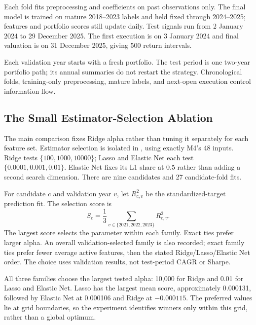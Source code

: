 \documentclass[11pt,a4paper]{article}
\newcommand{\code}[1]{\texttt{\detokenize{#1}}}
\newcommand{\tbl}[3]{\begin{table}[htbp]\centering\small
\caption{#2}\label{#3}#1\end{table}}
\begin{document}
Each fold fits preprocessing and coefficients on past observations only.
The final model is trained on mature 2018--2023 labels and held fixed through
2024--2025; features and portfolio scores still update daily.
Test signals run from 2 January 2024 to 29 December 2025. The first execution
is on 3 January 2024 and final valuation is on 31 December 2025, giving
500 return intervals.

Each validation year starts with a fresh portfolio. The test period is one
two-year portfolio path; its annual summaries do not restart the strategy.
Chronological folds, training-only preprocessing, mature labels, and
next-open execution control information flow.

\subsection{The Small Estimator-Selection Ablation}
The main comparison fixes Ridge alpha rather than tuning it
separately for each feature set. Estimator selection is isolated in
\code{model4_ablation.py}, using exactly M4's 48 inputs. Ridge tests
$\{100,1000,10000\}$; Lasso and Elastic Net each test
$\{0.0001,0.001,0.01\}$. Elastic Net fixes its L1 share at $0.5$ rather than
adding a second search dimension. There are nine candidates and
27 candidate-fold fits.

For candidate $c$ and validation year $v$, let $R^2_{c,v}$ be the
standardized-target prediction fit. The selection score is
\begin{equation}
S_c=\frac{1}{3}\sum_{v\in\{2021,2022,2023\}}R^2_{c,v}.
\label{eq:selection}
\end{equation}
The largest score selects the parameter within each family. Exact ties prefer
larger alpha. An overall validation-selected family is also recorded; exact
family ties prefer fewer average active features, then the stated
Ridge/Lasso/Elastic Net order. The choice uses validation results,
not test-period CAGR or Sharpe.

\tbl{\SearchTable}{Complete validation search on the 48-factor input set.
Values are dimensionless prediction $R^2$, not return percentages.}{tab:grid}
All three families choose the largest tested alpha: 10,000 for Ridge and
0.01 for Lasso and Elastic Net. Lasso has the largest mean score,
approximately 0.000131, followed by Elastic Net at 0.000106 and Ridge at
$-0.000115$. The preferred values lie at grid boundaries, so the experiment
identifies winners only within this grid, rather than a global optimum.
\end{document}
